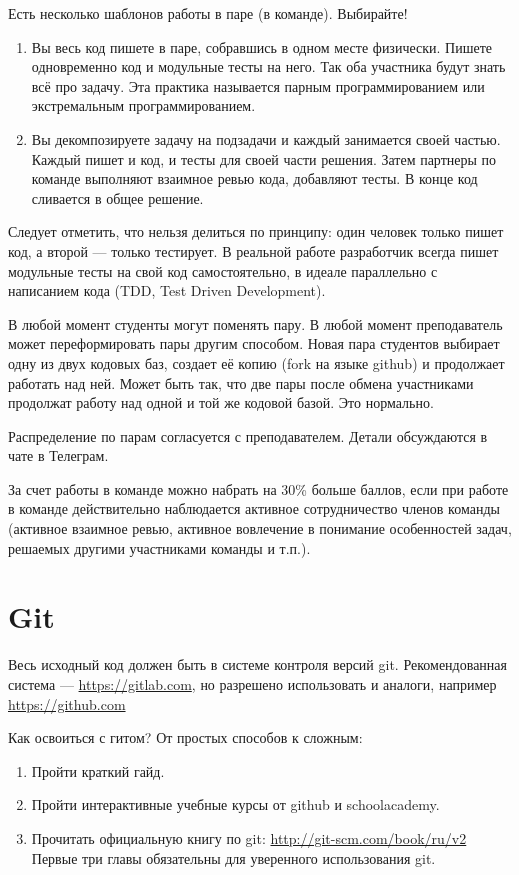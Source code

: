 \documentclass[a4paper,12pt]{article}
\begin{document}
Есть несколько шаблонов работы в паре (в команде). Выбирайте!
\begin{enumerate}
    \item Вы весь код пишете в паре, собравшись в одном месте физически. Пишете одновременно код и модульные тесты на него. Так оба участника будут знать всё про задачу. Эта практика называется парным программированием или экстремальным программированием.
    \item Вы декомпозируете задачу на подзадачи и каждый занимается своей частью. Каждый пишет и код, и тесты для своей части решения. Затем партнеры по команде выполняют взаимное ревью кода, добавляют тесты. В конце код сливается в общее решение.
\end{enumerate}

Следует отметить, что нельзя делиться по принципу: один человек только пишет код, а второй — только тестирует. В реальной работе разработчик всегда пишет модульные тесты на свой код самостоятельно, в идеале параллельно с написанием кода (TDD, Test Driven Development).

В любой момент студенты могут поменять пару. В любой момент преподаватель может переформировать пары другим способом. Новая пара студентов выбирает одну из двух кодовых баз, создает её копию (fork на языке github) и продолжает работать над ней. Может быть так, что две пары после обмена участниками продолжат работу над одной и той же кодовой базой. Это нормально.

Распределение по парам согласуется с преподавателем. Детали обсуждаются в чате в Телеграм.

За счет работы в команде можно набрать на 30\% больше баллов, если при работе в команде действительно наблюдается активное сотрудничество членов команды (активное взаимное ревью, активное вовлечение в понимание особенностей задач, решаемых другими участниками команды и т.п.).

\section{Git}

Весь исходный код должен быть в системе контроля версий git. Рекомендованная система — \url{https://gitlab.com}, но разрешено использовать и аналоги, например \url{https://github.com}

Как освоиться с гитом? От простых способов к сложным:
\begin{enumerate}
    \item Пройти краткий гайд.
    \item Пройти интерактивные учебные курсы от github и schoolacademy.
    \item Прочитать официальную книгу по git: \url{http://git-scm.com/book/ru/v2} Первые три главы обязательны для уверенного использования git.
\end{enumerate}
\end{document}
